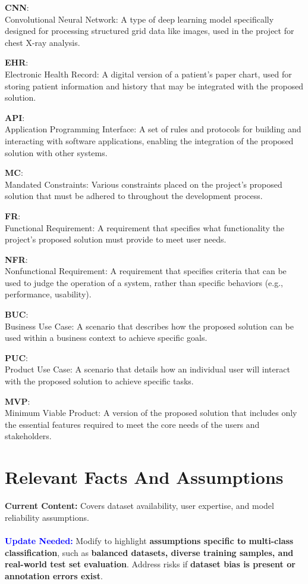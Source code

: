 \documentclass[12pt]{article}
\begin{document}
\textbf{CNN}:\\
Convolutional Neural Network: A type of deep learning model specifically designed for processing 
structured grid data like images, used in the project for chest X-ray analysis.

\textbf{EHR}:\\
Electronic Health Record: A digital version of a patient's paper chart, used for storing patient 
information and history that may be integrated with the proposed solution.

\textbf{API}:\\
Application Programming Interface: A set of rules and protocols for building and interacting with 
software applications, enabling the integration of the proposed solution with other systems.

\textbf{MC}:\\
Mandated Constraints: Various constraints placed on the project’s proposed solution that must be 
adhered to throughout the development process.

\textbf{FR}:\\
Functional Requirement: A requirement that specifies what functionality the project’s proposed 
solution must provide to meet user needs.

\textbf{NFR}:\\
Nonfunctional Requirement: A requirement that specifies criteria that can be used to judge the 
operation of a system, rather than specific behaviors (e.g., performance, usability).

\textbf{BUC}:\\
Business Use Case: A scenario that describes how the proposed solution can be used within a 
business context to achieve specific goals.

\textbf{PUC}:\\
Product Use Case: A scenario that details how an individual user will interact with the proposed 
solution to achieve specific tasks.

\textbf{MVP}:\\
Minimum Viable Product: A version of the proposed solution that includes only the essential 
features required to meet the core needs of the users and stakeholders.

\section{Relevant Facts And Assumptions}
\textbf{Current Content:} Covers dataset availability, user expertise, and model reliability assumptions. \\
\\
\textbf{\textcolor{blue}{Update Needed:}} Modify to highlight \textbf{assumptions specific to multi-class classification}, such as \textbf{balanced datasets, diverse training samples, and real-world test set evaluation}. Address risks if \textbf{dataset bias is present or annotation errors exist}.
\end{document}
